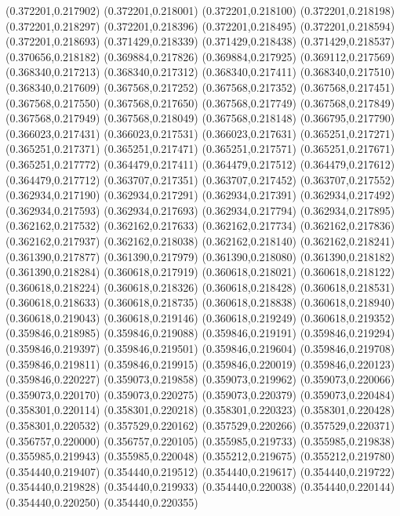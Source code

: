 (0.372201,0.217902)
(0.372201,0.218001)
(0.372201,0.218100)
(0.372201,0.218198)
(0.372201,0.218297)
(0.372201,0.218396)
(0.372201,0.218495)
(0.372201,0.218594)
(0.372201,0.218693)
(0.371429,0.218339)
(0.371429,0.218438)
(0.371429,0.218537)
(0.370656,0.218182)
(0.369884,0.217826)
(0.369884,0.217925)
(0.369112,0.217569)
(0.368340,0.217213)
(0.368340,0.217312)
(0.368340,0.217411)
(0.368340,0.217510)
(0.368340,0.217609)
(0.367568,0.217252)
(0.367568,0.217352)
(0.367568,0.217451)
(0.367568,0.217550)
(0.367568,0.217650)
(0.367568,0.217749)
(0.367568,0.217849)
(0.367568,0.217949)
(0.367568,0.218049)
(0.367568,0.218148)
(0.366795,0.217790)
(0.366023,0.217431)
(0.366023,0.217531)
(0.366023,0.217631)
(0.365251,0.217271)
(0.365251,0.217371)
(0.365251,0.217471)
(0.365251,0.217571)
(0.365251,0.217671)
(0.365251,0.217772)
(0.364479,0.217411)
(0.364479,0.217512)
(0.364479,0.217612)
(0.364479,0.217712)
(0.363707,0.217351)
(0.363707,0.217452)
(0.363707,0.217552)
(0.362934,0.217190)
(0.362934,0.217291)
(0.362934,0.217391)
(0.362934,0.217492)
(0.362934,0.217593)
(0.362934,0.217693)
(0.362934,0.217794)
(0.362934,0.217895)
(0.362162,0.217532)
(0.362162,0.217633)
(0.362162,0.217734)
(0.362162,0.217836)
(0.362162,0.217937)
(0.362162,0.218038)
(0.362162,0.218140)
(0.362162,0.218241)
(0.361390,0.217877)
(0.361390,0.217979)
(0.361390,0.218080)
(0.361390,0.218182)
(0.361390,0.218284)
(0.360618,0.217919)
(0.360618,0.218021)
(0.360618,0.218122)
(0.360618,0.218224)
(0.360618,0.218326)
(0.360618,0.218428)
(0.360618,0.218531)
(0.360618,0.218633)
(0.360618,0.218735)
(0.360618,0.218838)
(0.360618,0.218940)
(0.360618,0.219043)
(0.360618,0.219146)
(0.360618,0.219249)
(0.360618,0.219352)
(0.359846,0.218985)
(0.359846,0.219088)
(0.359846,0.219191)
(0.359846,0.219294)
(0.359846,0.219397)
(0.359846,0.219501)
(0.359846,0.219604)
(0.359846,0.219708)
(0.359846,0.219811)
(0.359846,0.219915)
(0.359846,0.220019)
(0.359846,0.220123)
(0.359846,0.220227)
(0.359073,0.219858)
(0.359073,0.219962)
(0.359073,0.220066)
(0.359073,0.220170)
(0.359073,0.220275)
(0.359073,0.220379)
(0.359073,0.220484)
(0.358301,0.220114)
(0.358301,0.220218)
(0.358301,0.220323)
(0.358301,0.220428)
(0.358301,0.220532)
(0.357529,0.220162)
(0.357529,0.220266)
(0.357529,0.220371)
(0.356757,0.220000)
(0.356757,0.220105)
(0.355985,0.219733)
(0.355985,0.219838)
(0.355985,0.219943)
(0.355985,0.220048)
(0.355212,0.219675)
(0.355212,0.219780)
(0.354440,0.219407)
(0.354440,0.219512)
(0.354440,0.219617)
(0.354440,0.219722)
(0.354440,0.219828)
(0.354440,0.219933)
(0.354440,0.220038)
(0.354440,0.220144)
(0.354440,0.220250)
(0.354440,0.220355)
